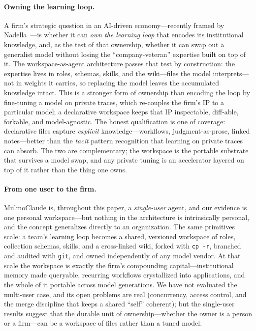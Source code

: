 \documentclass[11pt]{article}
\newcommand{\code}[1]{\texttt{\small #1}}
\begin{document}
\paragraph{Owning the learning loop.}
A firm's strategic question in an AI-driven economy---recently framed by
Nadella~\citep{nadella2026ecosystem}---is whether it can \emph{own the learning
loop} that encodes its institutional knowledge, and, as the test of that ownership,
whether it can swap out a generalist model without losing the ``company-veteran''
expertise built on top of it. The workspace-as-agent architecture passes that test
by construction: the expertise lives in roles, schemas, skills, and the
wiki---files the model interprets---not in weights it carries, so replacing the
model leaves the accumulated knowledge intact. This is a stronger form of ownership
than encoding the loop by fine-tuning a model on private traces, which re-couples
the firm's IP to a particular model; a declarative workspace keeps that IP
inspectable, diff-able, forkable, and model-agnostic. The honest qualification is
one of coverage: declarative files capture \emph{explicit} knowledge---workflows,
judgment-as-prose, linked notes---better than the \emph{tacit} pattern recognition
that learning on private traces can absorb. The two are complementary; the workspace
is the portable substrate that survives a model swap, and any private tuning is an
accelerator layered on top of it rather than the thing one owns.

\paragraph{From one user to the firm.}
MulmoClaude is, throughout this paper, a \emph{single-user} agent, and our evidence
is one personal workspace---but nothing in the architecture is intrinsically
personal, and the concept generalizes directly to an organization. The same
primitives scale: a team's learning loop becomes a shared, versioned workspace of
roles, collection schemas, skills, and a cross-linked wiki, forked with \code{cp -r},
branched and audited with \code{git}, and owned independently of any model vendor.
At that scale the workspace is exactly the firm's compounding capital---institutional
memory made queryable, recurring workflows crystallized into applications, and the
whole of it portable across model generations. We have not evaluated the multi-user
case, and its open problems are real (concurrency, access control, and the merge
discipline that keeps a shared ``self'' coherent); but the single-user results
suggest that the durable unit of ownership---whether the owner is a person or a
firm---can be a workspace of files rather than a tuned model.
\end{document}
